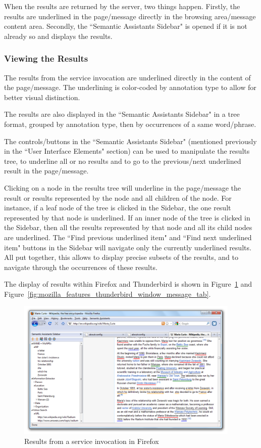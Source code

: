 When the results are returned by the server, two things happen. Firstly, the results are underlined in the page/message directly in the browsing area/message content area. Secondly, the ``Semantic Assistants Sidebar" is opened if it is not already so and displays the results. 

\subsubsection{Viewing the Results}
The results from the service invocation are underlined directly in the content of the page/message. The underlining is color-coded by annotation type to allow for better visual distinction. 

The results are also displayed in the ``Semantic Assistants Sidebar" in a tree format, grouped by annotation type, then by occurrences of a same word/phrase. 

The controls/buttons in the ``Semantic Assistants Sidebar" (mentioned previously in the ``User Interface Elements" section) can be used to manipulate the results tree, to underline all or no results and to go to the previous/next underlined result in the page/message.

Clicking on a node in the results tree will underline in the page/message the result or results represented by the node and all children of the node. For instance, if a leaf node of the tree is clicked in the Sidebar, the one result represented by that node is underlined. If an inner node of the tree is clicked in the Sidebar, then all the results represented by that node and all its child nodes are underlined. The ``Find previous underlined item" and ``Find next underlined item" buttons in the Sidebar will navigate only the currently underlined results. All put together, this allows to display precise subsets of the results, and to navigate through the occurrences of these results. 

The display of results within Firefox and Thunderbird is shown in Figure~\ref{fig:mozilla_features_firefox_window} and Figure~\ref{fig:mozilla_features_thunderbird_window_message_tab}.

\begin{figure}[htb]
  \centering
  \includegraphics[width=0.95\textwidth]{pictures/mozilla_features_firefox_window.png}
  \caption{Results from a service invocation in Firefox}
  \label{fig:mozilla_features_firefox_window}
\end{figure}

